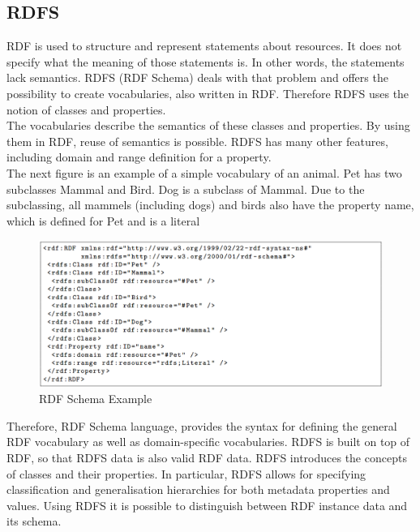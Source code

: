\documentclass[a4paper,12pt,oneside]{report}
\begin{document}
{{{\subsection {RDFS}
{RDF is used to structure and represent statements about resources. It does not specify what the meaning of those statements is. In other words, the statements lack semantics. RDFS (RDF Schema) deals with that problem and offers the possibility to create vocabularies, also written in RDF. Therefore RDFS uses the notion of classes and properties.\\
The vocabularies describe the semantics of these classes and properties. By using them in RDF, reuse of semantics is possible. RDFS has many other features, including domain and range definition for a property.\\
The next figure is an example of a simple vocabulary of an animal. Pet has two subclasses Mammal and Bird. Dog is a subclass of Mammal. Due to the subclassing, all mammels (including dogs) and birds also have the property name, which is defined for Pet and is a literal}
\begin{figure}[ht]
\centering
\includegraphics[width=1\textwidth]{Capture4}
\caption{RDF Schema Example}
\end{figure}
{Therefore, RDF Schema language, provides the syntax for defining the general RDF vocabulary as well as domain-specific vocabularies. RDFS is built on top of RDF, so that RDFS data is also valid RDF data.  RDFS introduces the concepts of classes and their properties.  In particular, RDFS allows for specifying classification and generalisation hierarchies for both metadata properties and values. Using RDFS it is possible to distinguish between RDF instance data and its schema.}
}}}
\end{document}
